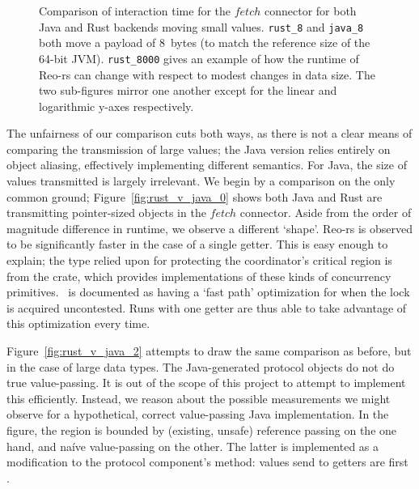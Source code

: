 \begin{figure}
{\begin{subfigure}[b]{0.63\textwidth}
			\caption{}
			\label{fig:rust_v_java_1}
		\end{subfigure}%
	}
	\caption[Java vs.\ Rust interaction time for small values.]{Comparison of interaction time for the $fetch$ connector for both Java and Rust backends moving small values. \texttt{rust\_8} and \texttt{java\_8}  both move a payload of 8~bytes (to match the reference size of the 64-bit JVM). \texttt{rust\_8000}  gives an example of how the runtime of Reo-rs can change with respect to modest changes in data size. The two sub-figures mirror one another except for the linear and logarithmic y-axes respectively.}
	\label{fig:rust_v_java}
\end{figure}

The unfairness of our comparison cuts both ways, as there is not a clear means of comparing the transmission of large values; the Java version relies entirely on object aliasing, effectively implementing different semantics. For Java, the size of values transmitted is largely irrelevant. We begin by a comparison on the only common ground; Figure~\ref{fig:rust_v_java_0} shows both Java and Rust are transmitting pointer-sized objects in the $fetch$ connector. Aside from the order of magnitude difference in runtime, we observe a different `shape'. Reo-rs is observed to be significantly faster in the case of a single getter. This is easy enough to explain; the type relied upon for protecting the coordinator's critical region is  from the  crate, which provides implementations of these kinds of concurrency primitives. ~is documented as having a `fast path' optimization for when the lock is acquired uncontested. Runs with one getter are thus able to take advantage of this optimization every time.

Figure~\ref{fig:rust_v_java_2} attempts to draw the same comparison as before, but in the case of large data types. The Java-generated protocol objects do not do true value-passing. It is out of the scope of this project to attempt to implement this efficiently. Instead, we reason about the possible measurements we might observe for a hypothetical, correct value-passing Java implementation. In the figure, the region is bounded by (existing, unsafe) reference passing on the one hand, and na\'ive value-passing on the other. The latter is implemented as a modification to the protocol component's  method: values send to getters are first .

